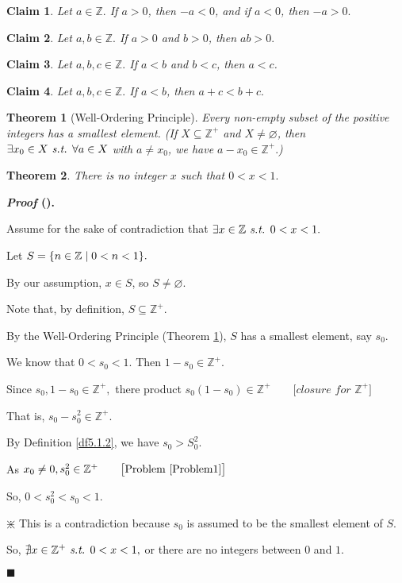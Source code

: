 \documentclass[12pt,a4paper]{article}
\newtheorem{thm}{Theorem}[subsection]
\newtheorem{clm}{Claim}[subsection]
\newcounter{nprf}[subsection]
\newenvironment*{prf}{\par\indent\textbf{\textit{Proof} (\stepcounter{nprf}\thenprf). }\par }{\par\hfill $\blacksquare$\par}
\def\Z{{\mathbb{Z}}}
\def\Zp{{\Z^{+}}}
\def\emptyset{\varnothing}
\def\st{\emph{ s.t. }}
\begin{document}
\begin{clm}
	Let $a\in\Z.$ If $a>0$, then $-a<0$, and if $a<0$, then $-a>0.$	
\end{clm}
\begin{clm}
	Let $a,b\in\Z.$ If $a>0$ and $b>0$, then $ab>0.$
\end{clm}
\begin{clm}
	Let $a,b,c\in\Z.$ If $a<b$ and $b<c$, then $a<c$.
\end{clm}
\begin{clm}
	Let $a,b,c\in\Z.$ If $a<b$, then $a+c<b+c.$
\end{clm}

\begin{thm}[Well-Ordering Principle]\label{thm5.1.1}
	Every non-empty subset of the positive integers has a smallest element. 	(If $X\subseteq\Zp$ and $X\neq\emptyset$, then $\exists x_0\in X\st\forall a\in X$ with $a\neq x_0$, we have $a-x_0\in\Zp.$)
\end{thm}
\begin{framed}
\begin{thm}\label{thm5.1.2}
	There is no integer $x$ such that $0<x<1.$	
\end{thm}
\begin{prf}
	Assume for the sake of contradiction that $\exists x\in\Z\st0<x<1.$\par Let $S=\qty{n\in\Z\mid0<n<1}.$\par By our assumption, $x\in S$, so $S\neq\emptyset.$\par Note that, by definition, $S\subseteq\Zp$.\par  By the Well-Ordering Principle (Theorem \ref{thm5.1.1}), $S$ has a smallest element, say $s_0$.\par We know that $0<s_0<1$. Then $1-s_0\in\Zp.$\par Since $s_0,1-s_0\in\Zp,$ there product $s_0(1-s_0)\in\Zp\qquad\big[\textit{closure for $\Zp$}\big]$\par That is, $s_0-s_0^2\in\Zp.$\par By Definition \ref{df5.1.2}, we have $s_0>S_0^2.$\par As $x_0\neq0, s_0^2\in\Zp\qquad\big[\text{Problem \ref{Problem1}}\big]$\par So, $0<s_0^2<s_0<1.$\par\begin{center}$\divideontimes$ This is a contradiction because $s_0$ is assumed to be the smallest element of $S$.\end{center}\par So, $\nexists x\in\Zp\st0<x<1,$ or there are no integers between $0$ and $1$.
\end{prf}
\end{framed}
\end{document}
